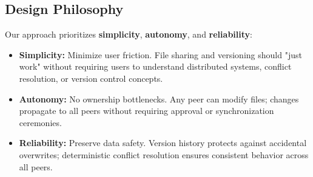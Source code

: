 \documentclass[11pt,oneside]{article}
\begin{document}
\subsection{Design Philosophy}

Our approach prioritizes \textbf{simplicity}, \textbf{autonomy}, and \textbf{reliability}:
\begin{itemize}
    \item \textbf{Simplicity:} Minimize user friction. File sharing and versioning should "just work" without requiring users to understand distributed systems, conflict resolution, or version control concepts.
    \item \textbf{Autonomy:} No ownership bottlenecks. Any peer can modify files; changes propagate to all peers without requiring approval or synchronization ceremonies.
    \item \textbf{Reliability:} Preserve data safety. Version history protects against accidental overwrites; deterministic conflict resolution ensures consistent behavior across all peers.
\end{itemize}
\end{document}
